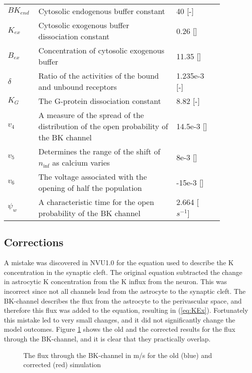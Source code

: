 \begin{table}[h!]
	\centering
	\begin{tabular}{| p{0.09\linewidth} | >{\footnotesize} p{0.6\linewidth} | >{\footnotesize} p{0.17\linewidth} | >{\footnotesize} p{0.02\linewidth} |}
		\arrayrulecolor{lightgrey}\hline
		
		$BK_{end}$      & Cytosolic endogenous buffer constant                              & 40 [-] & \cite{LoesEvert} \\
		$K_{ex}$        & Cytosolic exogenous buffer dissociation constant                  & 0.26 [\uM] & \cite{LoesEvert} \\
		$B_{ex}$        & Concentration of cytosolic exogenous buffer                       & 11.35 [\uM] & \cite{LoesEvert} \\
		$\delta$        & Ratio of the activities of the bound and unbound receptors        & 1.235e-3 [-] & \cite{Farr2011}\\
		$K_G$           & The G-protein dissociation constant                               & 8.82  [-] & \cite{Farr2011}\\
		$v_{4}$			& A measure of the spread of the distribution of the open probability of the BK channel	& 14.5e-3 [\Volt]   &  \cite{Gonzalez1994} \\
		$v_{5}$			& Determines the range of the shift of $n_{\inf}$ as calcium varies    	& 8e-3 [\Volt]  & \cite{Farr2011}  \\
		$v_{6}$			& The voltage associated with the opening of half the population		& -15e-3 [\Volt]  & \cite{Farr2011}  \\
		$ \psi_{w}$    	& A characteristic time for the open probability of the BK channel		& 2.664 [$s^{-1}$] & \cite{Gonzalez1994} \\
		
		\hline
	\end{tabular}
\end{table}

\subsection{Corrections}
A mistake was discovered in NVU1.0 for the equation used to describe the \gls{K} concentration in the synaptic cleft. The original equation subtracted the change in astrocytic \gls{K} concentration from the \gls{K} influx from the neuron. This was incorrect since not all channels lead from the astrocyte to the synaptic cleft. The BK-channel describes the flux from the astrocyte to the perivascular space, and therefore this flux was added to the equation, resulting in (\ref{eq:KEx}). Fortunately this mistake led to very small changes, and it did not significantly change the model outcomes. Figure \ref{fig:cordif} shows the old and the corrected results for the flux through the BK-channel, and it is clear that they practically overlap. 

\begin{figure}[h!]
	\centering
	\tiny 
				\newlength\figureheight 
				\newlength\figurewidth 
	\setlength\figureheight{5 cm} 
	\setlength\figurewidth{15 cm}
	
	\caption{The flux through the BK-channel in \uM m/s for the old (blue) and corrected (red) simulation }
	\label{fig:cordif}
\end{figure}